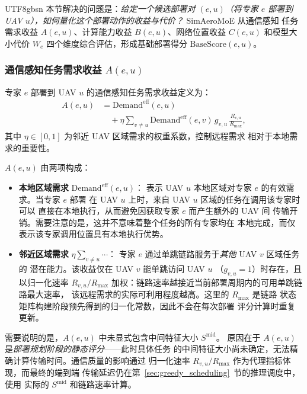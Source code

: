 \documentclass[conference]{IEEEtran}
\begin{document}
\begin{CJK*}{UTF8}{gbsn}
本节解决的问题是：\emph{给定一个候选部署对 $(e,u)$（将专家 $e$ 部署到
UAV $u$），如何量化这个部署动作的收益与代价？} SimAeroMoE 从通信感知
任务需求收益 $A(e,u)$、计算能力收益 $B(e,u)$、网络位置收益 $C(e,u)$
和模型大小代价 $W_e$ 四个维度综合评估，形成基础部署得分
$\mathrm{BaseScore}(e,u)$。

\subsubsection{通信感知任务需求收益 \texorpdfstring{$A(e,u)$}{A(e,u)}}

专家 $e$ 部署到 UAV $u$ 的通信感知任务需求收益定义为：
\begin{equation}
\begin{aligned}
A(e,u) &= \mathrm{Demand}^{\mathrm{eff}}(e,u) \\
&\quad + \eta \sum_{v\neq u} \mathrm{Demand}^{\mathrm{eff}}(e,v)\,
g_{v,u}\,\frac{R_{v,u}}{R_{\max}},
\end{aligned}
\label{eq:A}
\end{equation}
其中 $\eta\in[0,1]$ 为邻近 UAV 区域需求的权重系数，控制远程需求
相对于本地需求的重要性。

$A(e,u)$ 由两项构成：
\begin{itemize}
  \item \textbf{本地区域需求} $\mathrm{Demand}^{\mathrm{eff}}(e,u)$：
        表示 UAV $u$ 本地区域对专家 $e$ 的有效需求。当专家 $e$ 部署
        在 UAV $u$ 上时，来自 UAV $u$ 区域的任务在调用该专家时可以
        直接在本地执行，从而避免因获取专家 $e$ 而产生额外的 UAV 间
        传输开销。需要注意的是，这并不意味着整个任务的所有专家均在
        本地完成，而仅表示该专家调用位置具有本地执行优势。
  \item \textbf{邻近区域需求} $\eta\sum_{v\neq u}\cdots$：
        专家 $e$ 通过单跳链路服务于\emph{其他} UAV $v$ 区域任务的
        潜在能力。该收益仅在 UAV $v$ 能单跳访问 UAV $u$
        （$g_{v,u}=1$）时存在，且以归一化速率 $R_{v,u}/R_{\max}$
        加权：链路速率越接近当前部署周期内的可用单跳链路最大速率，
        该远程需求的实际可利用程度越高。这里的 $R_{\max}$ 是链路
        状态矩阵构建阶段预先得到的归一化常数，因此不会在每次部署
        评分计算时重复更新。
\end{itemize}

需要说明的是，$A(e,u)$ 中未显式包含中间特征大小 $S^{\mathrm{mid}}$。
原因在于 $A(e,u)$ 是\emph{部署规划阶段的静态评分}——此时具体任务
的中间特征大小尚未确定，无法精确计算传输时间。通信质量的影响通过
归一化速率 $R_{v,u}/R_{\max}$ 作为代理指标体现，而最终的端到端
传输延迟仍在第~\ref{sec:greedy_scheduling}~节的推理调度中，使用
实际的 $S^{\mathrm{mid}}$ 和链路速率计算。


\end{CJK*}
\end{document}
